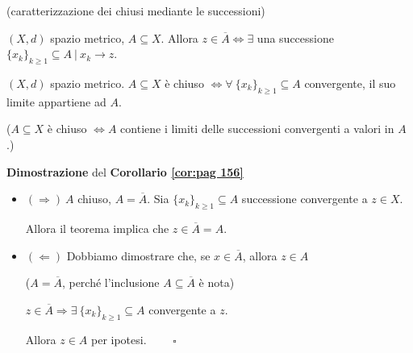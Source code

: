 \begin{theorem} (caratterizzazione dei chiusi mediante le successioni)
\label{th:pag 156}	
	
$(X,d)$ spazio metrico, $A \subseteq X$. Allora $z \in \overline{A} \iff \exists$ una successione $\{x_k\}_{k \geq 1} \subseteq A \ \big| \ x_k \rightarrow z$.
\end{theorem}


\begin{corollary}
	\label{cor:pag 156}
	$(X,d)$ spazio metrico. $A \subseteq X$ è chiuso $\iff \forall \ \{x_k\}_{k \geq 1} \subseteq A$ convergente, il suo limite appartiene ad $A$.
	
	($A \subseteq X$ è chiuso $\iff A$ contiene i limiti delle successioni convergenti a valori in $A$.)
\end{corollary}


\begin{dembar}
	\textbf{Dimostrazione} del \textbf{Corollario \ref{cor:pag 156}}
	
	\begin{itemize}
		\item $(\Rightarrow) \ A$ chiuso, $A = \overline{A}$. Sia $\{x_k\}_{k \geq 1} \subseteq A$ successione convergente a $z \in X$.
		
		Allora il teorema implica che $z \in \overline{A}= A$.
		
		\item $(\Leftarrow)$ Dobbiamo dimostrare che, se $x \in \overline{A}$, allora $z \in A$
		
		($A = \overline{A}$, perché l'inclusione $A \subseteq \overline{A}$ è nota)
		
		$z \in \overline{A} \Rightarrow \exists \ \{x_k\}_{k \geq 1} \subseteq A$ convergente a $z$. 
		
		Allora $z \in A$ per ipotesi. $\qquad \square$
	\end{itemize}
\end{dembar}


